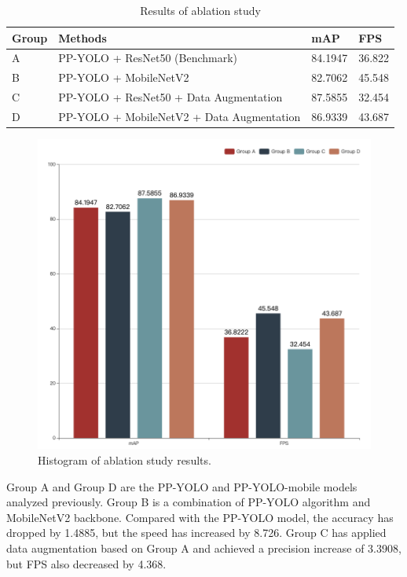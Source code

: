 \documentclass[sensors,article,submit,moreauthors,pdftex]{Definitions/mdpi}
\begin{document}
\begin{table}[htbp]
\centering
\caption{Results of ablation study}
\begin{tabular}{llll} 
\toprule
\textbf{Group}&\textbf{Methods}&\textbf{mAP}&\textbf{FPS}\\
\midrule
A& PP-YOLO + ResNet50 (Benchmark) &84.1947 & 36.822\\
\cmidrule(r){1-4}
B& PP-YOLO + MobileNetV2 &82.7062 & 45.548\\
C& PP-YOLO + ResNet50 + Data Augmentation & 87.5855 & 32.454\\
D& PP-YOLO + MobileNetV2 + Data Augmentation & 86.9339& 43.687\\
\bottomrule
\end{tabular}
\label{tbl:Results of ablation study}
\end{table}

\begin{figure}[htbp]
\centering
\includegraphics[width=1\columnwidth]{images/ablation-bar.png}
\caption{Histogram of ablation study results.}
\label{fig:ablation-bar}
\end{figure}

Group A and Group D are the PP-YOLO and PP-YOLO-mobile models analyzed previously. Group B is a combination of PP-YOLO algorithm and MobileNetV2 backbone. Compared with the PP-YOLO model, the accuracy has dropped by 1.4885, but the speed has increased by 8.726. Group C has applied data augmentation based on Group A and achieved a precision increase of 3.3908, but FPS also decreased by 4.368.
\end{document}
